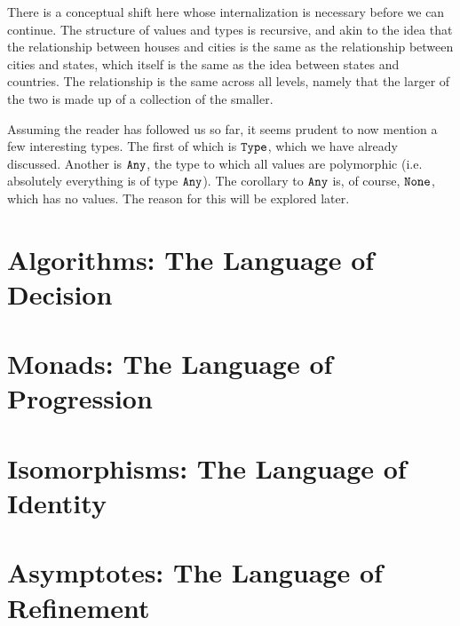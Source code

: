 \documentclass[12pt]{book}
\newcommand{\type}[1]{\text{\texttt{#1}}}
\begin{document}
There is a conceptual shift here whose internalization is necessary before we can continue. The structure of values and
types is recursive, and akin to the idea that the relationship between houses and cities is the same as the relationship
between cities and states, which itself is the same as the idea between states and countries. The relationship is the
same across all levels, namely that the larger of the two is made up of a collection of the smaller.

Assuming the reader has followed us so far, it seems prudent to now mention a few interesting types. The first of which
is $\type{Type}$, which we have already discussed. Another is $\type{Any}$, the type to which all values are
polymorphic (i.e. absolutely everything is of type $\type{Any}$). The corollary to $\type{Any}$ is, of course,
$\type{None}$, which has no values. The reason for this will be explored later.

\chapter{Algorithms: The Language of Decision}
\chapter{Monads: The Language of Progression}
\chapter{Isomorphisms: The Language of Identity}
\chapter{Asymptotes: The Language of Refinement}
\end{document}
